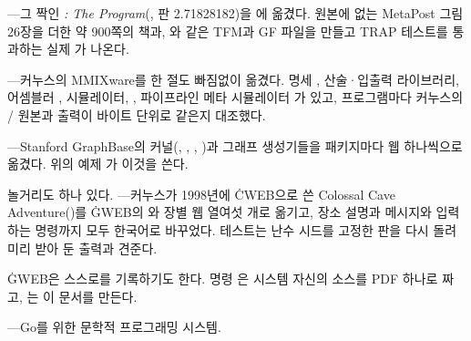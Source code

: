 \bull {}%
---그 짝인 {\slMF\it: The Program\/}(, 판 2.71828182)을
에 옮겼다. 원본에 없는 MetaPost 그림 26장을 더한 약 900쪽의 책과,
\MF 와 같은 TFM과 GF 파일을 만들고 TRAP 테스트를 통과하는 실제 가
나온다.

\bull {}---커누스의 MMIXware를
한 절도 빠짐없이 옮겼다. 명세 , 산술·입출력 라이브러리, 어셈블러
, 시뮬레이터, , 파이프라인 메타 시뮬레이터 가
있고, 프로그램마다 커누스의 \CEE/ 원본과 출력이 바이트 단위로 같은지 대조했다.

\bull {}---Stanford GraphBase의
커널(, , , )과 그래프 생성기들을
패키지마다 웹 하나씩으로 옮겼다. 위의 예제 가 이것을 쓴다.

\noindent 놀거리도 하나 있다. %
---커누스가 1998년에 \.{CWEB}으로 쓴 Colossal Cave Adventure()를
\.{GWEB}의 와 장별 웹 열여섯 개로 옮기고, 장소 설명과 메시지와
입력하는 명령까지 모두 한국어로 바꾸었다. 테스트는 난수 시드를 고정한 판을
다시 돌려 미리 받아 둔 출력과 견준다.

\noindent \.{GWEB}은 스스로를 기록하기도 한다. 명령 은 시스템
자신의  소스를 PDF 하나로 짜고, 는 이 문서를 만든다.

\vfill
\centerline{\eightrm{}---Go를 위한 문학적 프로그래밍 시스템.}
\bye
